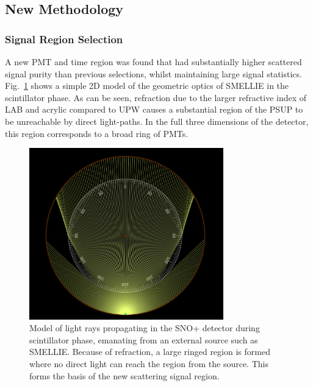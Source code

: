 \subsection{New Methodology}\label{sec:smellie_scatt_new_method}
\subsubsection{Signal Region Selection}
A new PMT and time region was found that had substantially higher scattered signal purity than previous selections, whilst maintaining large signal statistics. Fig.~\ref{fig:smellie_propagation_toy_model} shows a simple 2D model of the geometric optics of SMELLIE in the scintillator phase. As can be seen, refraction due to the larger refractive index of LAB and acrylic compared to UPW causes a substantial region of the PSUP to be unreachable by direct light-paths. In the full three dimensions of the detector, this region corresponds to a broad ring of PMTs.

\begin{figure}
    \centering
    \includegraphics[width=0.75\textwidth]{5_SMELLIEAnalysis/images/smellie_scattering_region_ray_optics_model.png}
    \caption[Model of light rays propagating in the SNO+ detector during scintillator phase, emanating from an external source such as SMELLIE]
    {Model of light rays propagating in the SNO+ detector during scintillator phase, emanating from an external source such as SMELLIE. Because of refraction, a large ringed region is formed where no direct light can reach the region from the source. This forms the basis of the new scattering signal region.}
    \label{fig:smellie_propagation_toy_model}
\end{figure}

